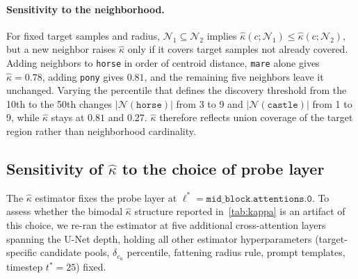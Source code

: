 \paragraph{Sensitivity to the neighborhood.}\label{app:kappa-ablation} For fixed target samples and radius, $\mathcal N_1\subseteq\mathcal N_2$ implies $\hat\kappa(c;\mathcal N_1)\le\hat\kappa(c;\mathcal N_2)$, but a new neighbor raises $\hat\kappa$ only if it covers target samples not already covered. Adding neighbors to \texttt{horse} in order of centroid distance, \texttt{mare} alone gives $\hat\kappa=0.78$, adding \texttt{pony} gives $0.81$, and the remaining five neighbors leave it unchanged. Varying the percentile that defines the discovery threshold from the 10th to the 50th changes $|\mathcal N(\texttt{horse})|$ from 3 to 9 and $|\mathcal N(\texttt{castle})|$ from 1 to 9, while $\hat\kappa$ stays at $0.81$ and $0.27$. $\hat\kappa$ therefore reflects union coverage of the target region rather than neighborhood cardinality.

 

\subsection{Sensitivity of $\hat\kappa$ to the choice of probe layer}
\label{app:layer_sensitivity}

The $\hat\kappa$ estimator fixes the probe layer at $\ell^* = \texttt{mid\_block.attentions.0}$. To assess whether the bimodal $\hat\kappa$ structure reported in~\cref{tab:kappa} is an artifact of this choice, we re-ran the estimator at five additional cross-attention layers spanning the U-Net depth, holding all other estimator hyperparameters (target-specific candidate pools, $\delta_{c_u}$ percentile, fattening radius rule, prompt templates, timestep $t^*=25$) fixed.

